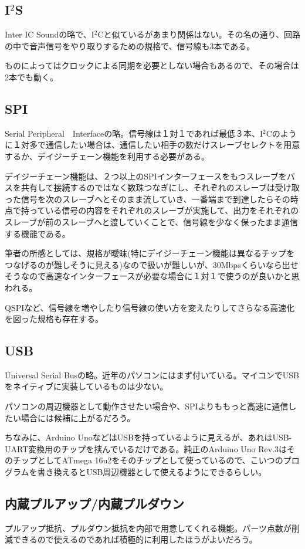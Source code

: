 \documentclass[a4paper,titlepage,here]{ujarticle}
\begin{document}
\subsection{I$^2$S}
Inter IC Soundの略で、I$^2$Cと似ているがあまり関係はない。その名の通り、回路の中で音声信号をやり取りするための規格で、信号線も3本である。

ものによってはクロックによる同期を必要としない場合もあるので、その場合は2本でも動く。
\subsection{SPI}
Serial Peripheral　Interfaceの略。信号線は１対１であれば最低３本、I$^2$Cのように１対多で通信したい場合は、通信したい相手の数だけスレーブセレクトを用意するか、デイジーチェーン機能を利用する必要がある。

デイジーチェーン機能は、２つ以上のSPIインターフェースをもつスレーブをバスを共有して接続するのではなく数珠つなぎにし、それぞれのスレーブは受け取った信号を次のスレーブへとそのまま流していき、一番端まで到達したらその時点で持っている信号の内容をそれぞれのスレーブが実施して、出力をそれぞれのスレーブが前のスレーブへと渡していくことで、信号線を少なく保ったまま通信する機能である。

筆者の所感としては、規格が曖昧(特にデイジーチェーン機能は異なるチップをつなげるのが難しそうに見える)なので扱いが難しいが、30Mbpsくらいなら出せそうなので高速なインターフェースが必要な場合に１対１で使うのが良いかと思われる。

QSPIなど、信号線を増やしたり信号線の使い方を変えたりしてさらなる高速化を図った規格も存在する。
\subsection{USB}
Universal Serial Busの略。近年のパソコンにはまず付いている。マイコンでUSBをネイティブに実装しているものは少ない。

パソコンの周辺機器として動作させたい場合や、SPIよりももっと高速に通信したい場合には候補に上がるだろう。

ちなみに、Arduino UnoなどはUSBを持っているように見えるが、あれはUSB-UART変換用のチップを挟んでいるだけである。純正のArduino Uno Rev.3はそのチップとしてATmega 16u2をそのチップとして使っているので、こいつのプログラムを書き換えるとUSB周辺機器として使えるようにできるらしい。
\subsection{内蔵プルアップ/内蔵プルダウン}
プルアップ抵抗、プルダウン抵抗を内部で用意してくれる機能。パーツ点数が削減できるので使えるのであれば積極的に利用したほうがよいだろう。
\end{document}
